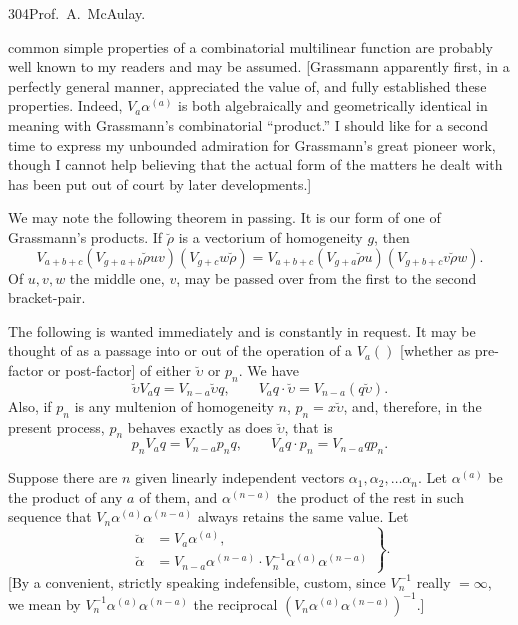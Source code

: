 \documentclass[11pt]{article}
\begin{document}
\newpage\thispagestyle{empty}\begin{center}304\hfill Prof.\ A.\ McAulay.\end{center}
common simple properties of a combinatorial multilinear function are probably well known to my readers and may be assumed. [Grassmann apparently first, in a perfectly general manner, appreciated the value of, and fully established these properties. Indeed, $V_a\alpha^{(a)}$ is both algebraically and geometrically identical in meaning with Grassmann's combinatorial ``product.'' I should like for a second time to express my unbounded admiration for Grassmann's great pioneer work, though I cannot help believing that the actual form of the matters he dealt with has been put out of court by later developments.]

\indent We may note the following theorem in passing. It is our form of one of Grassmann's products. If $\breve\rho$ is a vectorium of homogeneity $g$, then
\[V_{a+b+c}(V_{g+a+b}\breve\rho uv)(V_{g+c}w\breve\rho)=V_{a+b+c}(V_{g+a}\breve\rho u)(V_{g+b+c}v\breve\rho w).\]
Of $u,v,w$ the middle one, $v$, may be passed over from the first to the second bracket-pair.

\indent The following is wanted immediately and is constantly in request. It may be thought of as a passage into or out of the operation of a $V_a()$ [whether as pre-factor or post-factor] of either $\breve\upsilon$ or $p_n$. We have
\[\breve\upsilon V_aq=V_{n-a}\breve\upsilon q,\qquad V_aq\cdot\breve\upsilon=V_{n-a}(q\breve\upsilon).\]
Also, if $p_n$ is any multenion of homogeneity $n$, $p_n=x\breve\upsilon$, and, therefore, in the present process, $p_n$ behaves exactly as does $\breve\upsilon$, that is
\[p_nV_aq=V_{n-a}p_nq,\qquad V_aq\cdot p_n=V_{n-a}qp_n.\]

\indent Suppose there are $n$ given linearly independent vectors $\alpha_1,\alpha_2,\ldots\alpha_n$. Let $\alpha^{(a)}$ be the product of any $a$ of them, and $\alpha^{(n-a)}$ the product of the rest in such sequence that $V_n\alpha^{(a)}\alpha^{(n-a)}$ always retains the same value. Let
\begin{equation}\left.\begin{aligned}\breve\alpha&=V_a\alpha^{(a)},\\\breve\alpha&=V_{n-a}\alpha^{(n-a)}\cdot V_n^{-1}\alpha^{(a)}\alpha^{(n-a)}\end{aligned}\right\}.\tag{1}\end{equation}
[By a convenient, strictly speaking indefensible, custom, since $V_n^{-1}$ really $=\infty$, we mean by $V_n^{-1}\alpha^{(a)}\alpha^{(n-a)}$ the reciprocal $(V_n\alpha^{(a)}\alpha^{(n-a)})^{-1}$.]
\end{document}
